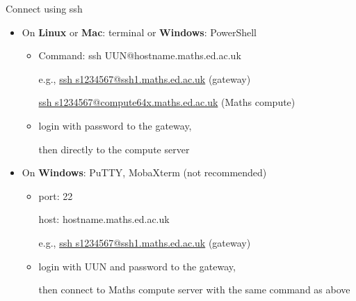 \documentclass[10pt]{beamer}
\begin{document}
\begin{frame}[fragile]{Connect using ssh\footnotemark}

\begin{itemize}
    \item{
    On \textbf{Linux} or \textbf{Mac}: terminal or \textbf{Windows}: PowerShell
    \begin{itemize}
        \item {Command: ssh UUN@hostname.maths.ed.ac.uk
        
        e.g., \underline{ssh s1234567@ssh1.maths.ed.ac.uk} (gateway)
        
        \quad \quad \underline{ssh s1234567@compute64x.maths.ed.ac.uk} (Maths compute)
        }
        \item {login with password to the gateway, 
        
        then directly to the compute server}
    \end{itemize}
    }
    \hfill
    \item{
    On \textbf{Windows}: PuTTY, MobaXterm (not recommended)
    \begin{itemize}
        \item {port: 22
        
        host: hostname.maths.ed.ac.uk 
        
        e.g., \underline{ssh s1234567@ssh1.maths.ed.ac.uk} (gateway)}
        \item {login with UUN and password to the gateway, 
        
        then connect to Maths compute server with the same command as above}
    \end{itemize}
    }
\end{itemize}


\end{frame}
\end{document}
